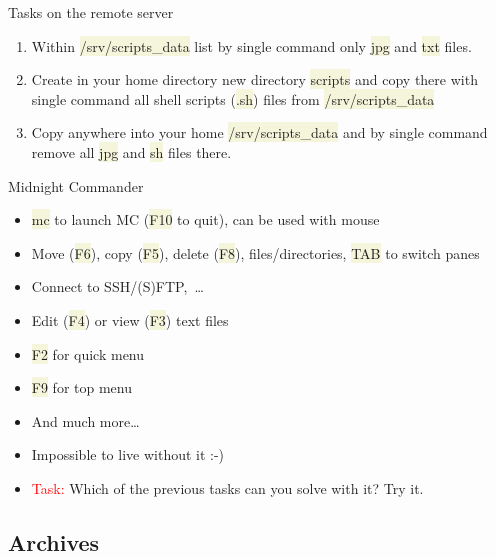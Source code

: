 \documentclass[compress, xelatex, 11pt, xcolor=svgnames, aspectratio=169,
	hyperref={
		bookmarks=true,
		unicode=true,
		colorlinks=true,
		pdftitle={Linux, command line and MetaCentrum},
		plainpages=false,
		pdfauthor={Vojtech Zeisek},
		pdfsubject={Course about use of Linux command line, writing shell scripts and using MetaCentrum of CESNET},
		pdfcreator={XeLaTeX},
		pdfkeywords={Linux, GNU, BASH, shell, command line, MetaCentrum},
		linkcolor=DarkRed, %
		anchorcolor=DarkBlue, %
		citecolor=Indigo, %
		filecolor=NavyBlue, %
		menucolor=DarkMagenta, %
		urlcolor=DarkBlue, %
		},
	url={hyphens, lowtilde} %
	]{beamer}
\renewcommand{\texttt}[1]{\colorbox{Beige}{{\ttfamily #1}}}
\renewcommand{\alert}[1]{\textcolor{red}{#1}}
\begin{document}
\begin{frame}[allowframebreaks]{Tasks on the remote server}
\begin{enumerate}
		\item Within \texttt{/srv/scripts\_data} list by single command only \texttt{jpg} and \texttt{txt} files.
		\item Create in your home directory new directory \texttt{scripts} and copy there with single command all shell scripts (\texttt{*.sh}) files from \texttt{/srv/scripts\_data}
		\item Copy anywhere into your home \texttt{/srv/scripts\_data} and by single command remove all \texttt{jpg} and \texttt{sh} files there.
	\end{enumerate}
\end{frame}

\begin{frame}{Midnight Commander}
	\begin{multicols}{2}
		\begin{itemize}
			\item \texttt{mc} to launch MC (\texttt{F10} to quit), can be used with mouse
			\item Move (\texttt{F6}), copy (\texttt{F5}), delete (\texttt{F8}), files/directories, \texttt{TAB} to switch panes
			\item Connect to SSH/(S)FTP,~\ldots
			\item Edit (\texttt{F4}) or view (\texttt{F3}) text files
			\item \texttt{F2} for quick menu
			\item \texttt{F9} for top menu
			\item And much more\ldots
			\item Impossible to live without it :-)
			\item \alert{Task:} Which of the previous tasks can you solve with it? Try it.
		\end{itemize}
		\begin{center}
			\texttt{[image: mc.png]}
		\end{center}
	\end{multicols}
\end{frame}

\subsection{Archives}
\end{document}
